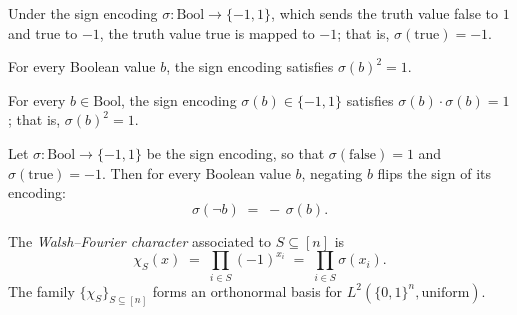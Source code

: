 \begin{lemma}
Under the sign encoding $\sigma\colon \mathrm{Bool}\to\{-1,1\}$, which sends the truth
value false to $1$ and true to $-1$, the truth value true is mapped to $-1$; that is,
$\sigma(\text{true}) = -1$.

For every Boolean value $b$, the sign encoding satisfies $\sigma(b)^2 = 1$.

For every $b \in \mathrm{Bool}$, the sign encoding $\sigma(b) \in \{-1,1\}$ satisfies
$\sigma(b)\cdot\sigma(b) = 1$; that is, $\sigma(b)^2 = 1$.

Let $\sigma\colon\mathrm{Bool}\to\{-1,1\}$ be the sign encoding, so that
$\sigma(\mathrm{false})=1$ and $\sigma(\mathrm{true})=-1$. Then for every Boolean value
$b$, negating $b$ flips the sign of its encoding:
\[
  \sigma(\lnot b) \;=\; -\,\sigma(b).
\]
\end{lemma}

\begin{definition}
\label{BooleanAnalysis.chiS}
\leanok
{}
The \emph{Walsh--Fourier character} associated to $S\subseteq[n]$ is
\[
  \chi_S(x) \;=\; \prod_{i\in S}(-1)^{x_i}
  \;=\; \prod_{i\in S}\sigma(x_i).
\]
The family $\{\chi_S\}_{S\subseteq[n]}$ forms an orthonormal basis for
$L^2(\{0,1\}^n,\mathrm{uniform})$.
\end{definition}


